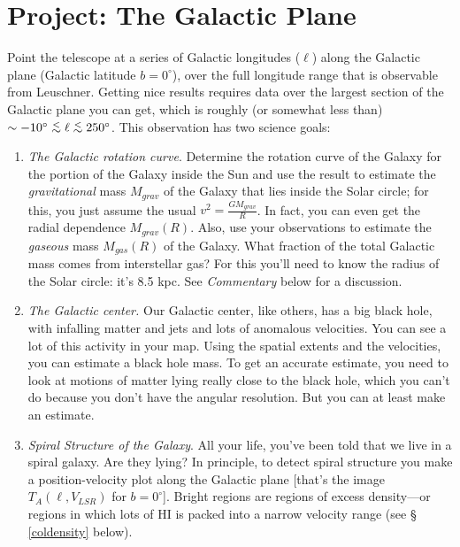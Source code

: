 \documentclass[psfig,preprint]{aastex}
\def\simlt{\lower.5ex\hbox{$\; \buildrel < \over \sim \;$}}
\begin{document}
\section{Project: The Galactic Plane } 
\label{galacticplane}

\noindent
	Point the telescope at a series of Galactic longitudes ($\ell$)
along the Galactic plane (Galactic latitude $b = 0^\circ$), over the
full longitude range that is observable from Leuschner.  Getting nice
results requires data over the largest section of the Galactic plane you
can get, which is roughly (or somewhat less than) $\sim -10^\circ \simlt
\ell \simlt 250^\circ$. This observation has two science goals:
\begin{enumerate}

	\item {\it The Galactic rotation curve}. Determine the rotation
curve of the Galaxy for the portion of the Galaxy inside the Sun and use
the result to estimate the {\it gravitational} mass $M_{grav}$ of the
Galaxy that lies inside the Solar circle; for this, you just assume the
usual $v^2 = \frac{G M_{grav}}{R}$.  In fact, you can even get the
radial dependence $M_{grav}(R)$. Also, use your observations to estimate
the {\it gaseous} mass $M_{gas}(R)$ of the Galaxy.  What fraction of the
total Galactic mass comes from interstellar gas? For this you'll need to
know the radius of the Solar circle: it's 8.5 kpc.  See {\it Commentary}
below for a discussion. 

\item {\it The Galactic center.} Our Galactic center, like others, has a
  big black hole, with infalling matter and jets and lots of anomalous
  velocities. You can see a lot of this activity in  your map. Using the
  spatial extents and the velocities, you can estimate a black hole
  mass. To get an accurate estimate, you need to look at motions of
  matter lying really close to the black hole, which you can't do
  because you don't have the angular resolution. But you can at least
  make an estimate.

	\item {\it Spiral Structure of the Galaxy}. All your life,
you've been told that we live in a spiral galaxy.  Are they lying? In
principle, to detect spiral structure you make a position-velocity plot
along the Galactic plane [that's the image $T_A(\ell,V_{LSR})$ for
$b=0^\circ$].  Bright regions are regions of excess density---or regions in
which lots of HI is packed into a narrow velocity range (see \S
\ref{coldensity} below). 


\end{enumerate}
\end{document}

